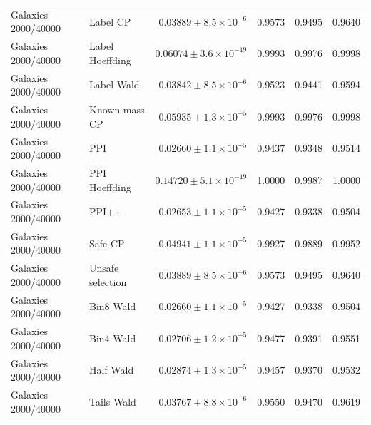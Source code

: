\begin{longtable}{llrrrr}
Galaxies 2000/40000 & Label CP & $0.03889\pm 8.5\times 10^{-6}$ & 0.9573 & 0.9495 & 0.9640 \\
Galaxies 2000/40000 & Label Hoeffding & $0.06074\pm 3.6\times 10^{-19}$ & 0.9993 & 0.9976 & 0.9998 \\
Galaxies 2000/40000 & Label Wald & $0.03842\pm 8.5\times 10^{-6}$ & 0.9523 & 0.9441 & 0.9594 \\
Galaxies 2000/40000 & Known-mass CP & $0.05935\pm 1.3\times 10^{-5}$ & 0.9993 & 0.9976 & 0.9998 \\
Galaxies 2000/40000 & PPI & $0.02660\pm 1.1\times 10^{-5}$ & 0.9437 & 0.9348 & 0.9514 \\
Galaxies 2000/40000 & PPI Hoeffding & $0.14720\pm 5.1\times 10^{-19}$ & 1.0000 & 0.9987 & 1.0000 \\
Galaxies 2000/40000 & PPI++ & $0.02653\pm 1.1\times 10^{-5}$ & 0.9427 & 0.9338 & 0.9504 \\
Galaxies 2000/40000 & Safe CP & $0.04941\pm 1.1\times 10^{-5}$ & 0.9927 & 0.9889 & 0.9952 \\
Galaxies 2000/40000 & Unsafe selection & $0.03889\pm 8.5\times 10^{-6}$ & 0.9573 & 0.9495 & 0.9640 \\
Galaxies 2000/40000 & Bin8 Wald & $0.02660\pm 1.1\times 10^{-5}$ & 0.9427 & 0.9338 & 0.9504 \\
Galaxies 2000/40000 & Bin4 Wald & $0.02706\pm 1.2\times 10^{-5}$ & 0.9477 & 0.9391 & 0.9551 \\
Galaxies 2000/40000 & Half Wald & $0.02874\pm 1.3\times 10^{-5}$ & 0.9457 & 0.9370 & 0.9532 \\
Galaxies 2000/40000 & Tails Wald & $0.03767\pm 8.8\times 10^{-6}$ & 0.9550 & 0.9470 & 0.9619 \\
\bottomrule\end{longtable}\endgroup